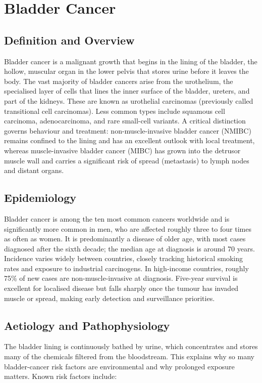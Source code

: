 \chapter{Bladder Cancer}

\section*{Definition and Overview}
Bladder cancer is a malignant growth that begins in the lining of the bladder, the hollow, muscular organ in the lower pelvis that stores urine before it leaves the body. The vast majority of bladder cancers arise from the urothelium, the specialised layer of cells that lines the inner surface of the bladder, ureters, and part of the kidneys. These are known as urothelial carcinomas (previously called transitional cell carcinomas). Less common types include squamous cell carcinoma, adenocarcinoma, and rare small-cell variants. A critical distinction governs behaviour and treatment: non-muscle-invasive bladder cancer (NMIBC) remains confined to the lining and has an excellent outlook with local treatment, whereas muscle-invasive bladder cancer (MIBC) has grown into the detrusor muscle wall and carries a significant risk of spread (metastasis) to lymph nodes and distant organs.

\section*{Epidemiology}
Bladder cancer is among the ten most common cancers worldwide and is significantly more common in men, who are affected roughly three to four times as often as women. It is predominantly a disease of older age, with most cases diagnosed after the sixth decade; the median age at diagnosis is around 70 years. Incidence varies widely between countries, closely tracking historical smoking rates and exposure to industrial carcinogens. In high-income countries, roughly 75\% of new cases are non-muscle-invasive at diagnosis. Five-year survival is excellent for localised disease but falls sharply once the tumour has invaded muscle or spread, making early detection and surveillance priorities.

\section*{Aetiology and Pathophysiology}
The bladder lining is continuously bathed by urine, which concentrates and stores many of the chemicals filtered from the bloodstream. This explains why so many bladder-cancer risk factors are environmental and why prolonged exposure matters. Known risk factors include:

